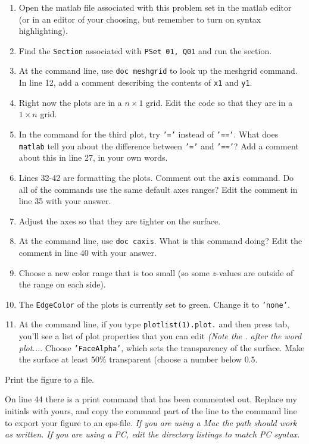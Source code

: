 \documentclass[12pt,letterpaper]{exam}
\begin{document}
\begin{questions}
\begin{parts}
\begin{enumerate}
\item Open the matlab file associated with this problem set in the matlab editor (or in an editor of your choosing, but remember to turn on syntax highlighting).
\item Find the \texttt{Section} associated with \texttt{PSet 01, Q01} and run the section.
\item At the command line, use \texttt{doc meshgrid} to look up the meshgrid command.  In line 12, add a comment describing the contents of \texttt{x1} and \texttt{y1}.
\item Right now the plots are in a $n\times 1$ grid.  Edit the code so that they are in a $1\times n$ grid.
\item In the command for the third plot, try \texttt{'='} instead of \texttt{'=='}.  What does \texttt{matlab} tell you about the difference between \texttt{'='} and \texttt{'=='}?  Add a comment about this in line 27, in your own words.
\item Lines 32-42 are formatting the plots.  Comment out the \texttt{axis} command.  Do all of the commands use the same default axes ranges?  Edit the comment in line 35 with your answer.
\item Adjust the axes so that they are tighter on the surface.
\item At the command line, use \texttt{doc caxis}.  What is this command doing?  Edit the comment in line 40 with your answer.
\item Choose a new color range that is too small (so some $z$-values are outside of the range on each side).
\item The \texttt{EdgeColor} of the plots is currently set to green.  Change it to \texttt{'none'}.
\item At the command line, if you type \texttt{plotlist(1).plot.} and then press tab, you'll see a list of plot properties that you can edit \emph{(Note the . after the word plot...}.  Choose \texttt{'FaceAlpha'}, which sets the transparency of the surface.  Make the surface at least $50$\% transparent (choose a number below $0.5$.
\end{enumerate}
\item Print the figure to a file.

On line 44 there is a print command that has been commented out.  Replace my initials with yours, and copy the command part of the line to the command line to export your figure to an eps-file.  \emph{If you are using a Mac the path should work as written.  If you are using a PC, edit the directory listings to match PC syntax.}


\end{parts}
\end{questions}
\end{document}

